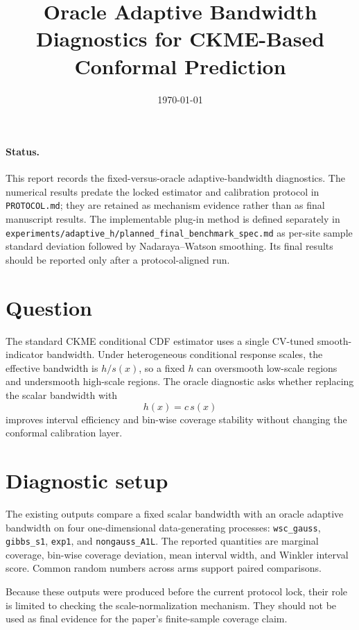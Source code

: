 \documentclass[11pt]{article}
\title{Oracle Adaptive Bandwidth Diagnostics for CKME-Based Conformal Prediction}
\author{}
\date{\today}
\begin{document}
\maketitle

\paragraph{Status.}
This report records the fixed-versus-oracle adaptive-bandwidth diagnostics.
The numerical results predate the locked estimator and calibration protocol in
\texttt{PROTOCOL.md}; they are retained as mechanism evidence rather than as
final manuscript results. The implementable plug-in method is defined separately
in \texttt{experiments/adaptive\_h/planned\_final\_benchmark\_spec.md} as
per-site sample standard deviation followed
by Nadaraya--Watson smoothing. Its final results should be reported only after a
protocol-aligned run.

\section{Question}

The standard CKME conditional CDF estimator uses a single CV-tuned smooth-indicator
bandwidth. Under heterogeneous conditional response scales, the effective
bandwidth is \(h/s(x)\), so a fixed \(h\) can oversmooth low-scale regions and
undersmooth high-scale regions. The oracle diagnostic asks whether replacing the
scalar bandwidth with
\[
  h(x)=c\,s(x)
\]
improves interval efficiency and bin-wise coverage stability without changing
the conformal calibration layer.

\section{Diagnostic setup}

The existing outputs compare a fixed scalar bandwidth with an oracle adaptive
bandwidth on four one-dimensional data-generating processes:
\texttt{wsc\_gauss}, \texttt{gibbs\_s1}, \texttt{exp1}, and
\texttt{nongauss\_A1L}. The reported quantities are marginal coverage, bin-wise
coverage deviation, mean interval width, and Winkler interval score. Common
random numbers across arms support paired comparisons.

Because these outputs were produced before the current protocol lock, their role
is limited to checking the scale-normalization mechanism. They should not be used
as final evidence for the paper's finite-sample coverage claim.
\end{document}
